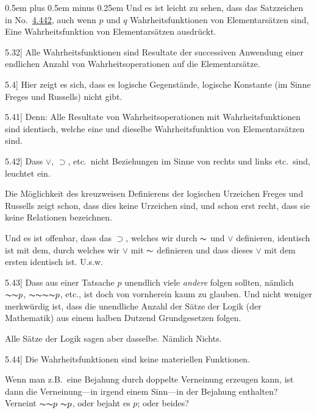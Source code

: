 \documentclass[12pt,oneside]{book}[2007/10/19]
\newcommand{\PropERef}[1]{\hyperref[PropE:#1]{#1}}
\newcommand{\PropositionG}[2]{%
  \item[\phantomsection\label{PropG:#1}\PropERef{#1}] #2%
}
\newcommand{\PropGRef}[1]{\hyperref[PropG:#1]{#1}}
\newcommand{\DPtypo}[2]{#2}
\newcommand{\Not}[1]{\mathord{\thicksim} #1}
\newcommand{\Implies}{\supset}
\newcommand{\Emph}[1]{\emph{#1}}%
\newcommand{\zumBeispiel}{z.\;B.}
\newcommand{\UndSoWeiter}{U.\;s.\;w.}
\newcommand{\verystretchyspace}{\spaceskip0.5em plus 0.5em minus 0.25em}
\newcommand{\AllowBreak}{\discretionary{}{}{}}
\begin{document}
\begin{propositions}
{{\verystretchyspace
Und es ist leicht zu sehen, dass das Satzzeichen
in No.~\DPtypo{\PropGRef{4.42}}{\PropGRef{4.442}}, auch wenn \glqq{}$p$\grqq{} und \glqq{}$q$\grqq{} Wahrheitsfunktionen
von Elementarsätzen sind, Eine
Wahrheitsfunktion von Elementarsätzen ausdrückt.}}


\PropositionG{5.32}
{Alle Wahrheitsfunktionen sind Resultate der
successiven Anwendung einer endlichen Anzahl
von Wahrheitsoperationen auf die Elementarsätze.}


\PropositionG{5.4}
{Hier zeigt es sich, dass es \glqq{}logische Gegenstände\grqq{},
\glqq{}logische Konstante\grqq{} (im Sinne Freges
und Russells) nicht gibt.}


\PropositionG{5.41}
{Denn: Alle Resultate von Wahrheitsoperationen
mit Wahrheitsfunktionen sind identisch,
welche eine und dieselbe Wahrheitsfunktion von
Elementarsätzen sind.}


\PropositionG{5.42}
{Dass $\lor$, $\Implies$, etc.\ nicht Beziehungen im Sinne von
rechts und links etc.\ sind, leuchtet ein.

Die Möglichkeit des kreuzweisen Definierens der
logischen \glqq{}Urzeichen\grqq{} Freges und Russells zeigt
schon, dass dies keine Urzeichen sind, und schon
erst recht, dass sie keine Relationen bezeichnen.

Und es ist offenbar, dass das \glqq{}$\Implies$\grqq{}, welches wir
durch \glqq{}$\Not{}$\grqq{} und \glqq{}$\lor$\grqq{} definieren, identisch ist mit dem,
durch welches wir \glqq{}$\lor$\grqq{} mit \glqq{}$\Not{}$\grqq{} definieren und dass
dieses \glqq{}$\lor$\grqq{} mit dem ersten identisch ist. \UndSoWeiter}


\PropositionG{5.43}
{Dass aus einer Tatsache $p$ unendlich viele
\Emph{andere} folgen sollten, nämlich $\Not{\Not{p}}$, $\Not{\Not{\Not{\Not{p}}}}$,
etc., ist doch von vornherein kaum zu glauben.
Und nicht weniger merkwürdig ist, dass die unendliche
Anzahl der Sätze der Logik (der Mathematik)
aus einem halben Dutzend \glqq{}Grundgesetzen\grqq{} folgen.

Alle Sätze der Logik sagen aber dasselbe. Nämlich
Nichts.}


\PropositionG{5.44}
{Die Wahrheitsfunktionen sind keine materiellen
Funktionen.

Wenn man \zumBeispiel\ eine Bejahung durch doppelte
Verneinung erzeugen kann, ist dann die Verneinung---in
irgend einem Sinn\AllowBreak---in der Bejahung enthalten?
Verneint \glqq{}$\Not{\Not{p}}$\grqq{} $\Not{p}$, oder bejaht es $p$; oder beides?

}
\end{propositions}
\end{document}
